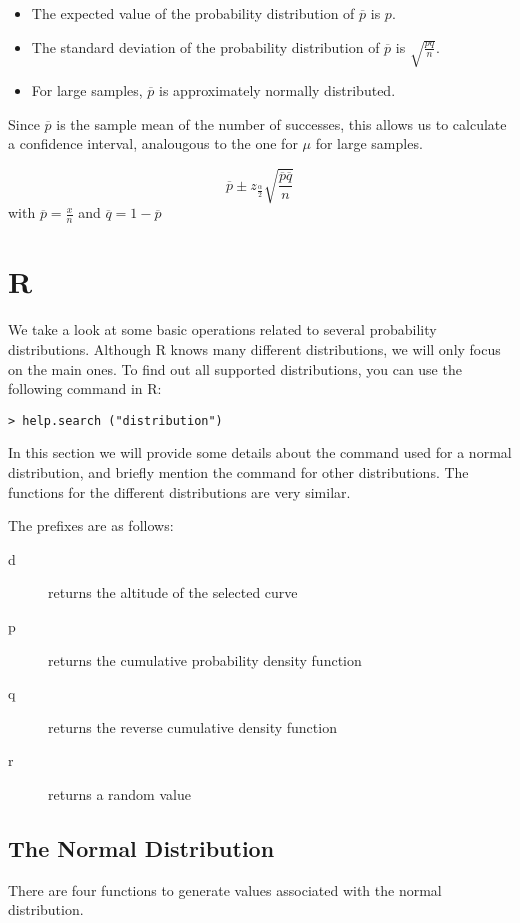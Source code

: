 \begin{itemize}
  \item The expected value of the probability distribution of $\overline{p}$ is $p$.
  \item The standard deviation of the probability distribution of $\overline{p}$ is $\sqrt{\frac{pq}{n}}$.
  \item For large samples, $\overline{p}$ is approximately normally distributed.
\end{itemize}

Since $\overline{p}$ is the sample mean of the number of successes, this allows us to calculate a confidence interval, analougous to the one for $\mu$ for large samples.

\begin{definition}
  \[ \overline{p} \pm z_{\frac{\alpha}{2}} \sqrt{\frac{\overline{p}\overline{q}}{n}} \]
  with $\overline{p} = \frac{x}{n}$ and $\overline{q} = 1- \overline{p}$
\end{definition}


\section{R}
We take a look at some basic operations related to several probability distributions.
Although R knows many different distributions, we will only focus on the main ones.
To find out all supported distributions, you can use the following command in R:

\begin{lstlisting}
> help.search ("distribution")
\end{lstlisting}

In this section we will provide some details about the command used for a normal distribution, and briefly mention the command for other distributions.
The functions for the different distributions are very similar.

The prefixes are as follows:
\begin{description}
	\item[d] returns the altitude of the selected curve
	\item[p] returns the cumulative probability density function
	\item[q] returns the reverse cumulative density function
	\item[r] returns a random value
\end{description}

\subsection{The Normal Distribution}
There are four functions to generate values associated with the normal distribution.
